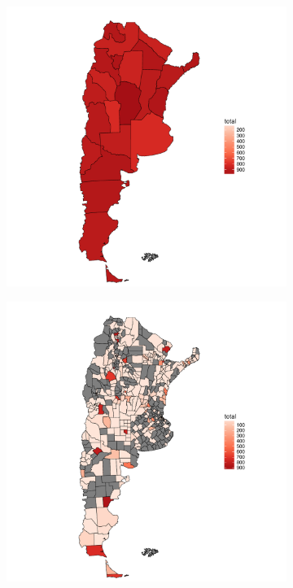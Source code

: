 \begin{figure}[!ht]\centering
  \begin{subfigure}[t]{0.31\textwidth}
    \includegraphics[width=\linewidth]{./images/mapaprovincias.pdf}
    \caption{} 
    \label{fig:mapaProvincias} 
   \end{subfigure}
   \begin{subfigure}[t]{0.31\textwidth}
    \includegraphics[width=\linewidth]{./images/mapadepartamentos.pdf}

\end{subfigure}
\end{figure}
